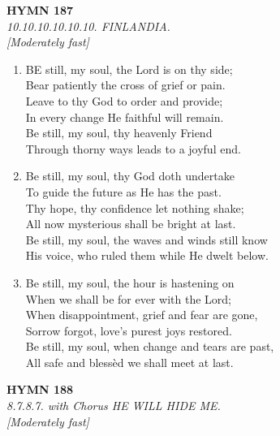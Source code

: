 \newpage
\begin{center}
    {\Large \textbf{HYMN 187}}
    \\
    \textit{10.10.10.10.10.10. FINLANDIA.}
    \\
    \textit{\small [Moderately fast]}
\end{center}
\vspace{1em}

\begin{enumerate}
    \item BE still, my soul, the Lord is on thy side; \\
        Bear patiently the cross of grief or pain. \\
        Leave to thy God to order and provide; \\
        In every change He faithful will remain. \\
        Be still, my soul, thy heavenly Friend \\
        Through thorny ways leads to a joyful end.

    \item Be still, my soul, thy God doth undertake \\
        To guide the future as He has the past. \\
        Thy hope, thy confidence let nothing shake; \\
        All now mysterious shall be bright at last. \\
        Be still, my soul, the waves and winds still know \\
        His voice, who ruled them while He dwelt below.

    \item Be still, my soul, the hour is hastening on \\
        When we shall be for ever with the Lord; \\
        When disappointment, grief and fear are gone, \\
        Sorrow forgot, love's purest joys restored. \\
        Be still, my soul, when change and tears are past, \\
        All safe and bless\`ed we shall meet at last.

\end{enumerate}

\newpage
\begin{center}
    {\Large \textbf{HYMN 188}}
    \\
    \textit{8.7.8.7. with Chorus HE WILL HIDE ME.}
    \\
    \textit{\small [Moderately fast]}
\end{center}
\vspace{1em}

